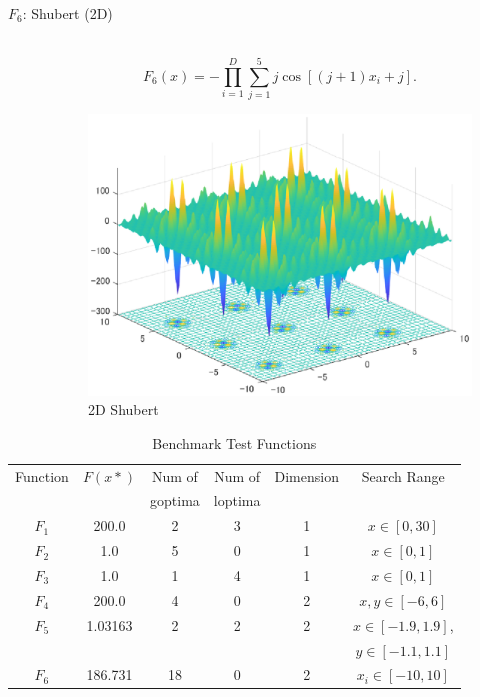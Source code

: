 \documentclass[a4j,11pt]{jarticle}
\begin{document}
\begin{description}
\item[$F_6$: Shubert (2D)]\mbox{}\\
\begin{equation}
\label{eq:F6}
F_6(x)=-\prod_{i=1}^D \sum_{j=1}^5 j\cos[(j+1)x_i+j].
\end{equation}
\begin{figure}[h]
\centering
\includegraphics[width=0.8\linewidth]{eps/F6.eps}
\caption{2D Shubert}
\label{fig:f6}
\end{figure}

\end{description}

\begin{table}[h]
\caption{Benchmark Test Functions}
\begin{center}
\begin{tabular}{c|c|c|c|c|c}
\hline

Function & $F(x*)$ & Num of & Num of & Dimension & Search Range \\
& & goptima & loptima & & \\
\hline
$F_1$ & 200.0 & 2 & 3 & 1 & $x \in [0,30]$  \\
\hline
$F_2$ & 1.0 & 5 & 0 & 1 & $x \in [0,1]$  \\
\hline
$F_3$ & 1.0 & 1 & 4 & 1 & $x \in [0,1]$  \\
\hline
$F_4$ & 200.0 & 4 & 0 & 2 & $x,y \in [-6,6]$  \\
\hline
$F_5$ & 1.03163 & 2 & 2 & 2 & $x \in [-1.9,1.9]$, \\
& & & & & $y \in [-1.1,1.1]$ \\
\hline
$F_6$ & 186.731 & 18 & 0 & 2 & $x_i \in [-10,10]$  \\
\hline
\end{tabular}
\label{tab:MOP}
\end{center}
\end{table}
\end{document}
